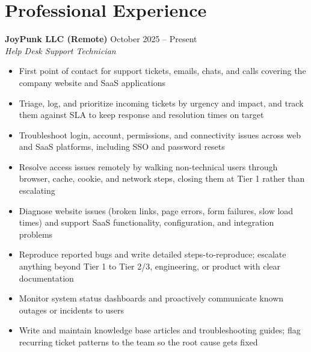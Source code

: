 \documentclass[letterpaper,10.5pt]{article}
\newcommand{\role}[3]{%
  \vspace{3pt}%
  \textbf{#1} \hfill {\small #3}\\[1pt]%
  {\small\itshape #2}\vspace{-2pt}%
}
\begin{document}
\section*{Professional Experience}

\role{JoyPunk LLC (Remote)}{Help Desk Support Technician}{October 2025 -- Present}
\begin{itemize}
  \item First point of contact for support tickets, emails, chats, and calls covering the company
        website and SaaS applications
  \item Triage, log, and prioritize incoming tickets by urgency and impact, and track them against
        SLA to keep response and resolution times on target
  \item Troubleshoot login, account, permissions, and connectivity issues across web and SaaS
        platforms, including SSO and password resets
  \item Resolve access issues remotely by walking non-technical users through browser, cache,
        cookie, and network steps, closing them at Tier 1 rather than escalating
  \item Diagnose website issues (broken links, page errors, form failures, slow load times) and
        support SaaS functionality, configuration, and integration problems
  \item Reproduce reported bugs and write detailed steps-to-reproduce; escalate anything beyond
        Tier 1 to Tier 2/3, engineering, or product with clear documentation
  \item Monitor system status dashboards and proactively communicate known outages or incidents to
        users
  \item Write and maintain knowledge base articles and troubleshooting guides; flag recurring ticket
        patterns to the team so the root cause gets fixed
\end{itemize}
\end{document}
